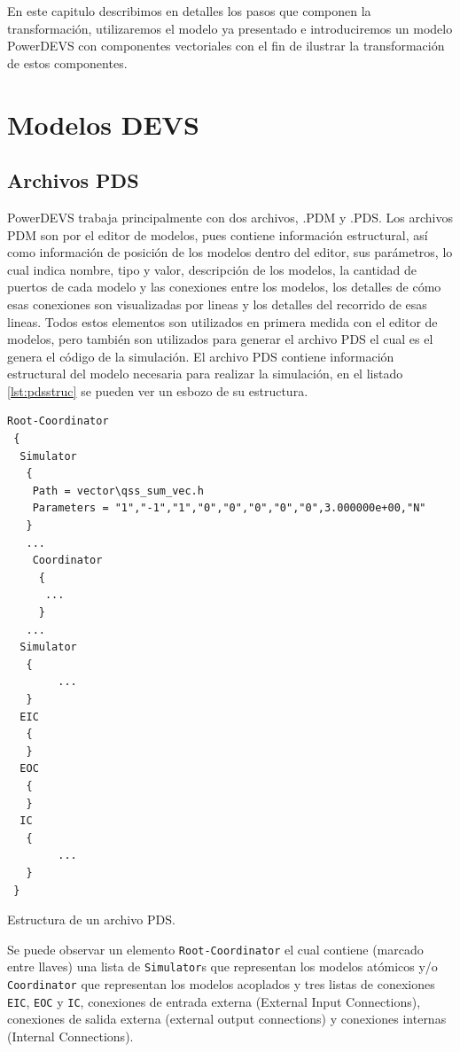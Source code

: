 	En este capitulo describimos en detalles los pasos que componen la transformación, utilizaremos el modelo ya presentado e introduciremos un modelo 
	PowerDEVS con componentes vectoriales con el fin de ilustrar la transformación de estos componentes.

\section{Modelos DEVS}

        \subsection{Archivos PDS}
        PowerDEVS trabaja principalmente con dos archivos, .PDM y .PDS.
        Los archivos PDM son  por el editor de modelos, pues contiene información estructural, así como información de posición de los modelos dentro del 
        editor, sus parámetros, lo cual indica nombre, tipo y valor, descripción de los modelos, la cantidad de puertos de cada modelo y las conexiones
        entre los modelos, los detalles de cómo esas conexiones son visualizadas por lineas y los detalles del recorrido de esas lineas. 
        Todos estos elementos son utilizados en primera medida con el editor de modelos, pero también son utilizados para generar el archivo PDS el cual es el 
        genera el código de la simulación.
        El archivo PDS contiene información estructural del modelo necesaria para realizar la simulación, en el listado \ref{lst:pdsstruc} se pueden ver un 
        esbozo de su estructura.
        
\begin{listing}[H]
\begin{verbatim}
Root-Coordinator
 {
  Simulator
   {
    Path = vector\qss_sum_vec.h
    Parameters = "1","-1","1","0","0","0","0","0",3.000000e+00,"N"
   }
   ...
    Coordinator
     {
      ...
     }
   ...     
  Simulator
   {
        ...
   }
  EIC
   {
   }
  EOC
   {
   }
  IC
   {
        ...
   }
 }
\end{verbatim}
\caption{Estructura de un archivo PDS.}
\label{lst:pdsstruc}
\end{listing}

        Se puede observar un elemento \texttt{Root-Coordinator} el cual contiene (marcado entre llaves) una lista de \texttt{Simulator}s que representan 
        los modelos atómicos y/o \texttt{Coordinator} que representan los modelos acoplados y tres listas de 
        conexiones \texttt{EIC}, \texttt{EOC} y \texttt{IC}, conexiones de entrada externa (External Input Connections), 
        conexiones de salida externa (external output connections) y conexiones internas (Internal Connections).

